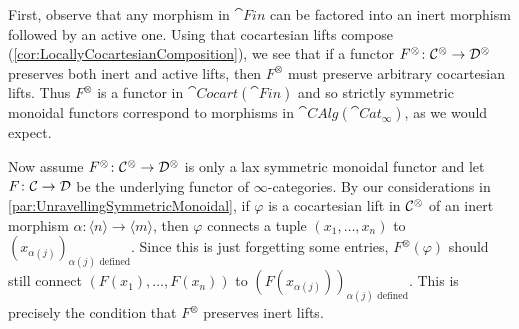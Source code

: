 \begin{numpar}\label{par:UnravellingLaxSymmetricMonoidal}
	First, observe that any morphism in $\cat{Fin}$ can be factored into an inert morphism followed by an active one. Using that cocartesian lifts compose (\cref{cor:LocallyCocartesianComposition}), we see that if a functor $F^\otimes\colon \mathcal{C}^\otimes\rightarrow \mathcal{D}^\otimes$ preserves both inert and active lifts, then $F^\otimes$ must preserve arbitrary cocartesian lifts. Thus $F^\otimes$ is a functor in $\cat{Cocart}(\cat{Fin})$ and so strictly symmetric monoidal functors correspond to morphisms in $\cat{CAlg}(\cat{Cat}_\infty)$, as we would expect.
	
	
	Now assume $F^\otimes\colon \mathcal{C}^\otimes\rightarrow \mathcal{D}^\otimes$ is only a lax symmetric monoidal functor and let $F\colon \mathcal{C}\rightarrow \mathcal{D}$ be the underlying functor of $\infty$-categories. By our considerations in \cref{par:UnravellingSymmetricMonoidal}, if $\varphi$ is a cocartesian lift in $\mathcal{C}^\otimes$ of an inert morphism $\alpha\colon \langle n\rangle\rightarrow \langle m\rangle$, then $\varphi$ connects a tuple $(x_1,\dotsc,x_n)$ to $(x_{\alpha(j)})_{\alpha(j)\text{ defined}}$. Since this is just forgetting some entries, $F^\otimes(\varphi)$ should still connect $(F(x_1),\dotsc,F(x_n))$ to $(F(x_{\alpha(j)}))_{\alpha(j)\text{ defined}}$. This is precisely the condition that $F^\otimes$ preserves inert lifts.
	

\end{numpar}
